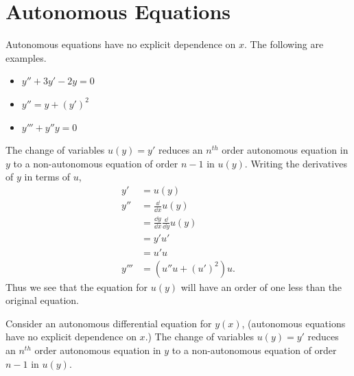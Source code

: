 \section{Autonomous Equations}
Autonomous equations have no explicit dependence on $x$.
The following are examples.
\begin{itemize}
\item $y'' + 3 y' - 2y = 0$
\item $y'' = y + (y')^2$
\item $y''' + y'' y = 0$
\end{itemize}

The change of variables $u(y) = y'$ reduces an $n^{th}$ order
autonomous equation in $y$
to a non-autonomous equation of order $n-1$ in $u(y)$.  Writing the derivatives
of $y$ in terms of $u$,
\begin{align*}
  y'      &= u(y) \\
  y''     &= \frac{\dd}{\dd x} u(y) \\
  &= \frac{\dd y}{\dd x}\frac{\dd}{\dd y} u(y) \\
  &= y' u' \\
  &= u' u \\
  y'''    &= (u'' u + (u')^2)u.
\end{align*}
Thus we see that the equation for $u(y)$ will have an order of one less than
the original equation.



\begin{Result}
  Consider an autonomous differential equation for $y(x)$, 
  (autonomous equations have no explicit dependence on $x$.)
  The change of variables $u(y) = y'$ reduces an $n^{th}$ order
  autonomous equation in $y$
  to a non-autonomous equation of order $n-1$ in $u(y)$.
\end{Result}




